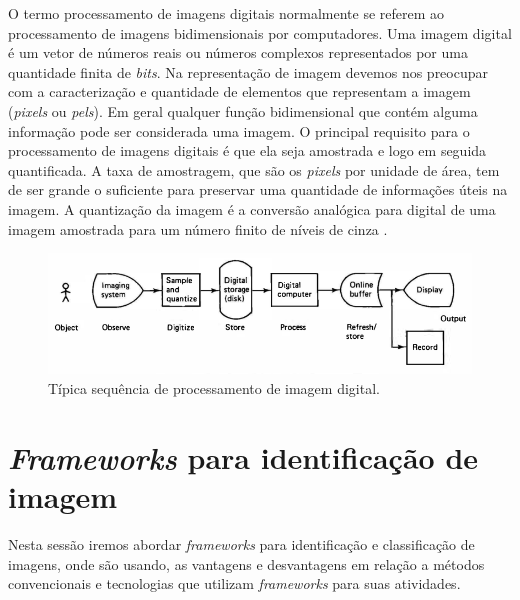 O termo processamento de imagens digitais normalmente se referem ao processamento de imagens bidimensionais por computadores. Uma imagem digital é um vetor de números reais ou números complexos representados por uma quantidade finita de \textit{bits}.
Na representação de imagem devemos nos preocupar com a caracterização e quantidade de elementos que representam a imagem (\textit{pixels} ou \textit{pels}). Em geral qualquer função bidimensional que contém alguma informação pode ser considerada uma imagem. O principal requisito para o processamento de imagens digitais é que ela seja amostrada e logo em seguida quantificada. A taxa de amostragem, que são os \textit{pixels} por unidade de área, tem de ser grande o suficiente para preservar uma quantidade de informações úteis na imagem. A quantização da imagem é a conversão analógica para digital de uma imagem amostrada para um número finito de níveis de cinza \cite{jain1989fundamentals}.
 \begin{figure}[h]
	\caption{\label{fig:digitalproc}Típica sequência de processamento de imagem digital.}
	\begin{center}
	    \includegraphics[width=.9\textwidth]{resources/digitalproc}
	\end{center}
\end{figure}





\section{\textit{Frameworks} para identificação de imagem}
Nesta sessão iremos abordar \textit{frameworks} para identificação e classificação de imagens, onde são usando, as vantagens e desvantagens em  relação a métodos convencionais e tecnologias que utilizam \textit{frameworks} para suas atividades. %

